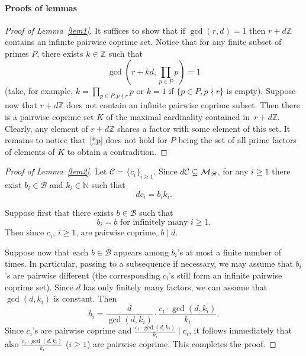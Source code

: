 \documentclass[leqno,a4paper,12pt]{article}
\theoremstyle{definition}
\newcommand{\divides}{\mid}
\newcommand{\ndivides}{\nmid}
\newcommand{\cm}{{\cal M}}
\newcommand{\Z}{{\mathbb{Z}}}
\newcommand{\N}{{\mathbb{N}}}
\newcommand{\sB}{\mathscr{B}}
\begin{document}
\paragraph{Proofs of lemmas}
\begin{proof}[Proof of Lemma~\ref{lem1}]
It suffices to show that if $\gcd(r,d)=1$ then $r+d\Z$ contains an infinite pairwise coprime set. Notice that for any finite subset of primes $P$, there exists $k\in \Z$ such that
\begin{equation}\label{*p}
\gcd(r+kd, \prod_{p\in P}p)=1
\end{equation}
(take, for example, $k=\prod_{p\in P, p\ndivides r}p$ or $k=1$ if $\{p\in P, p\ndivides r\}$ is empty). Suppose now that $r+d\Z$ does not contain an infinite pairwise coprime subset. Then there is a pairwise coprime set $K$ of the maximal cardinality contained in~$r+d\Z$. Clearly, any element of $r+d\Z$ shares a factor with some element of this set. It remains to notice that~\eqref{*p} does not hold for $P$ being the set of all prime factors of elements of $K$  to obtain a contradition.
\end{proof}
\begin{proof}[Proof of Lemma~\ref{lem2}]
Let $\mathcal{C}=\{c_i\}_{i\geq1}$. Since $d\mathcal{C}\subseteq\cm_\sB$, for any $i\geq1$ there exist $b_i\in\sB$ and $k_i\in\N$ such that
\[dc_i=b_ik_i.
\]

Suppose first that there exists $b\in\sB$ such that
\[
b_i=b \text{ for infinitely many }i\geq 1.
\]
Then since $c_i$, $i\geq1$, are pairwise coprime, $b\divides d$.

Suppose now that each $b\in\sB$ appears among $b_i$'s at most a finite number of times. In particular, passing to a subsequence if necessary, we may assume that $b_i$'s are pairwise different (the corresponding $c_i$'s still form an infinite pairwise coprime set). Since $d$ has only finitely many factors, we can assume that $\gcd(d,k_i)$ is constant. Then
\[
b_i=\frac{d}{\gcd(d,k_i)}\cdot \frac{c_i \cdot \gcd(d,k_i)}{k_i}.
\]
Since $c_i$'s are pairwise coprime and $\frac{c_i \cdot \gcd(d,k_i)}{k_i}\divides c_i$, it follows immediately that
also $\frac{c_i \cdot \gcd(d,k_i)}{k_i}$ ($i\geq 1$) are pairwise coprime. This completes the proof.
\end{proof}
\end{document}
